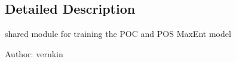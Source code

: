 \subsection{Detailed Description}
shared module for training the POC and POS MaxEnt model 

\begin{Desc}
\item[Author:]vernkin \end{Desc}

